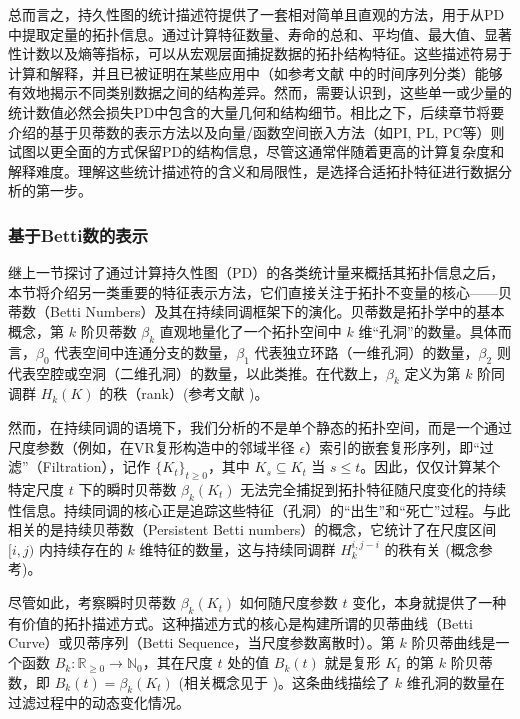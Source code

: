             总而言之，持久性图的统计描述符提供了一套相对简单且直观的方法，用于从PD中提取定量的拓扑信息。通过计算特征数量、寿命的总和、平均值、最大值、显著性计数以及熵等指标，可以从宏观层面捕捉数据的拓扑结构特征。这些描述符易于计算和解释，并且已被证明在某些应用中（如参考文献  中的时间序列分类）能够有效地揭示不同类别数据之间的结构差异。然而，需要认识到，这些单一或少量的统计数值必然会损失PD中包含的大量几何和结构细节。相比之下，后续章节将要介绍的基于贝蒂数的表示方法以及向量/函数空间嵌入方法（如PI, PL, PC等）则试图以更全面的方式保留PD的结构信息，尽管这通常伴随着更高的计算复杂度和解释难度。理解这些统计描述符的含义和局限性，是选择合适拓扑特征进行数据分析的第一步。
            
        \subsubsection{基于Betti数的表示}
            \label{sec:betti_features}
            继上一节探讨了通过计算持久性图（PD）的各类统计量来概括其拓扑信息之后，本节将介绍另一类重要的特征表示方法，它们直接关注于拓扑不变量的核心——贝蒂数（Betti Numbers）及其在持续同调框架下的演化。贝蒂数是拓扑学中的基本概念，第 $k$ 阶贝蒂数 $\beta_k$ 直观地量化了一个拓扑空间中 $k$ 维“孔洞”的数量。具体而言，$\beta_0$ 代表空间中连通分支的数量，$\beta_1$ 代表独立环路（一维孔洞）的数量，$\beta_2$ 则代表空腔或空洞（二维孔洞）的数量，以此类推。在代数上，$\beta_k$ 定义为第 $k$ 阶同调群 $H_k(K)$ 的秩（rank）(参考文献 )。

            然而，在持续同调的语境下，我们分析的不是单个静态的拓扑空间，而是一个通过尺度参数（例如，在VR复形构造中的邻域半径 $\epsilon$）索引的嵌套复形序列，即“过滤”（Filtration），记作 $\{K_t\}_{t \ge 0}$，其中 $K_s \subseteq K_t$ 当 $s \le t$。因此，仅仅计算某个特定尺度 $t$ 下的瞬时贝蒂数 $\beta_k(K_t)$ 无法完全捕捉到拓扑特征随尺度变化的持续性信息。持续同调的核心正是追踪这些特征（孔洞）的“出生”和“死亡”过程。与此相关的是持续贝蒂数（Persistent Betti numbers）的概念，它统计了在尺度区间 $[i, j)$ 内持续存在的 $k$ 维特征的数量，这与持续同调群 $H_k^{i, j-i}$ 的秩有关 (概念参考)。
            
            尽管如此，考察瞬时贝蒂数 $\beta_k(K_t)$ 如何随尺度参数 $t$ 变化，本身就提供了一种有价值的拓扑描述方式。这种描述方式的核心是构建所谓的贝蒂曲线（Betti Curve）或贝蒂序列（Betti Sequence，当尺度参数离散时）。第 $k$ 阶贝蒂曲线是一个函数 $B_k: \mathbb{R}_{\ge 0} \rightarrow \mathbb{N}_0$，其在尺度 $t$ 处的值 $B_k(t)$ 就是复形 $K_t$ 的第 $k$ 阶贝蒂数，即 $B_k(t) = \beta_k(K_t)$ (相关概念见于 )。这条曲线描绘了 $k$ 维孔洞的数量在过滤过程中的动态变化情况。
            
